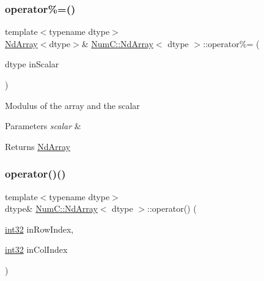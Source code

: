 \subsubsection{\texorpdfstring{operator\%=()}{operator\%=()}\hspace{0.1cm}{\footnotesize\ttfamily [2/2]}}
{\footnotesize\ttfamily template$<$typename dtype$>$ \\
\mbox{\hyperlink{class_num_c_1_1_nd_array}{Nd\+Array}}$<$dtype$>$\& \mbox{\hyperlink{class_num_c_1_1_nd_array}{Num\+C\+::\+Nd\+Array}}$<$ dtype $>$\+::operator\%= (\begin{DoxyParamCaption}\item[{dtype}]{in\+Scalar }\end{DoxyParamCaption})\hspace{0.3cm}{\ttfamily [inline]}}

Modulus of the array and the scalar


\begin{DoxyParams}{Parameters}
{\em scalar} & \\
\hline
\end{DoxyParams}
\begin{DoxyReturn}{Returns}
\mbox{\hyperlink{class_num_c_1_1_nd_array}{Nd\+Array}} 
\end{DoxyReturn}
\mbox{\label{class_num_c_1_1_nd_array_ae169bd3c7ad2bd3254c8317c173bb83b}} 
\subsubsection{\texorpdfstring{operator()()}{operator()()}\hspace{0.1cm}{\footnotesize\ttfamily [1/5]}}
{\footnotesize\ttfamily template$<$typename dtype$>$ \\
dtype\& \mbox{\hyperlink{class_num_c_1_1_nd_array}{Num\+C\+::\+Nd\+Array}}$<$ dtype $>$\+::operator() (\begin{DoxyParamCaption}\item[{\mbox{\hyperlink{namespace_num_c_aa5a7e69266097d55816d4cdb19542b53}{int32}}}]{in\+Row\+Index,  }\item[{\mbox{\hyperlink{namespace_num_c_aa5a7e69266097d55816d4cdb19542b53}{int32}}}]{in\+Col\+Index }\end{DoxyParamCaption})\hspace{0.3cm}{\ttfamily [inline]}}

